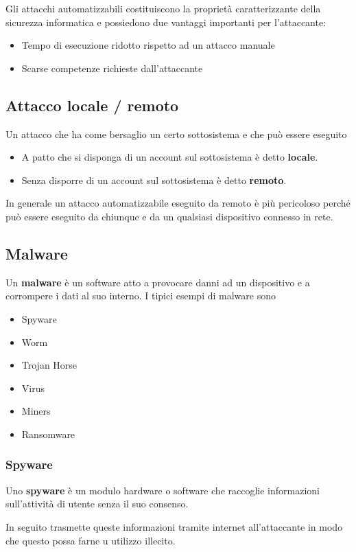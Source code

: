 Gli attacchi automatizzabili costituiscono la proprietà caratterizzante della sicurezza informatica e possiedono due
vantaggi importanti per l'attaccante:
\begin{itemize}
	\item Tempo di esecuzione ridotto rispetto ad un attacco manuale
	\item Scarse competenze richieste dall'attaccante
\end{itemize}

\subsection{Attacco locale / remoto}
Un attacco che ha come bersaglio un certo sottosistema e che può essere eseguito
\begin{itemize}
	\item A patto che si disponga di un account sul sottosistema è detto \textbf{locale}.
	\item Senza disporre di un account sul sottosistema è detto \textbf{remoto}.
\end{itemize}
In generale un attacco automatizzabile eseguito da remoto è più pericoloso perché può essere eseguito da chiunque e
da un qualsiasi dispositivo connesso in rete.

\subsection{Malware}
Un \textbf{malware} è un software atto a provocare danni ad un dispositivo e a corrompere i dati al suo interno. I
tipici esempi di malware sono
\begin{itemize}
	\item Spyware
	\item Worm
	\item Trojan Horse
	\item Virus
	\item Miners
	\item Ransomware
\end{itemize}

\subsubsection{Spyware}
Uno \textbf{spyware} è un modulo hardware o software che raccoglie informazioni sull'attività di utente senza il suo
consenso.

In seguito trasmette queste informazioni tramite internet all'attaccante in modo che questo possa farne u utilizzo
illecito.

